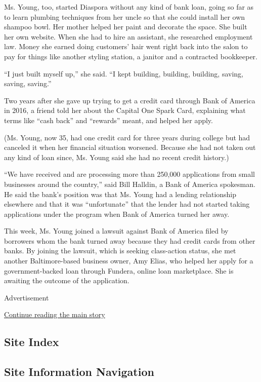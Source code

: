 Ms. Young, too, started Diaspora without any kind of bank loan, going so
far as to learn plumbing techniques from her uncle so that she could
install her own shampoo bowl. Her mother helped her paint and decorate
the space. She built her own website. When she had to hire an assistant,
she researched employment law. Money she earned doing customers' hair
went right back into the salon to pay for things like another styling
station, a janitor and a contracted bookkeeper.

``I just built myself up,'' she said. ``I kept building, building,
building, saving, saving, saving.''

Two years after she gave up trying to get a credit card through Bank of
America in 2016, a friend told her about the Capital One Spark Card,
explaining what terms like ``cash back'' and ``rewards'' meant, and
helped her apply.

(Ms. Young, now 35, had one credit card for three years during college
but had canceled it when her financial situation worsened. Because she
had not taken out any kind of loan since, Ms. Young said she had no
recent credit history.)

``We have received and are processing more than 250,000 applications
from small businesses around the country,'' said Bill Halldin, a Bank of
America spokesman. He said the bank's position was that Ms. Young had a
lending relationship elsewhere and that it was ``unfortunate'' that the
lender had not started taking applications under the program when Bank
of America turned her away.

This week, Ms. Young joined a lawsuit against Bank of America filed by
borrowers whom the bank turned away because they had credit cards from
other banks. By joining the lawsuit, which is seeking class-action
status, she met another Baltimore-based business owner, Amy Elias, who
helped her apply for a government-backed loan through Fundera, online
loan marketplace. She is awaiting the outcome of the application.

Advertisement

\protect\hyperlink{after-bottom}{Continue reading the main story}

\hypertarget{site-index}{%
\subsection{Site Index}\label{site-index}}

\hypertarget{site-information-navigation}{%
\subsection{Site Information
Navigation}\label{site-information-navigation}}

